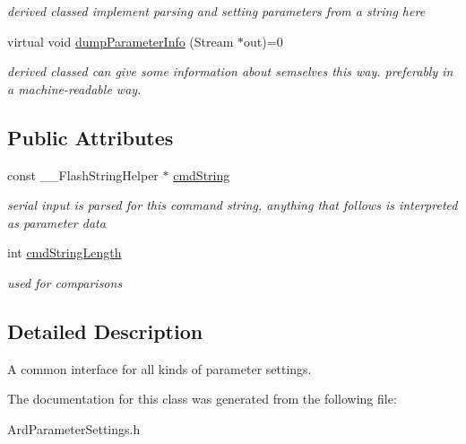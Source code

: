 \begin{DoxyCompactItemize}
\begin{DoxyCompactList}\small\item\em derived classed implement parsing and setting parameters from a string here \end{DoxyCompactList}\item 
\hypertarget{class_abstract_parameter_setting_aefe541268dbae23700182557c13d6b55}{virtual void \hyperlink{class_abstract_parameter_setting_aefe541268dbae23700182557c13d6b55}{dump\-Parameter\-Info} (Stream $\ast$out)=0}\label{class_abstract_parameter_setting_aefe541268dbae23700182557c13d6b55}

\begin{DoxyCompactList}\small\item\em derived classed can give some information about semselves this way. preferably in a machine-\/readable way. \end{DoxyCompactList}\end{DoxyCompactItemize}
\subsection*{Public Attributes}
\begin{DoxyCompactItemize}
\item 
\hypertarget{class_abstract_parameter_setting_a038edb8c34265166b4d7927cf0ee2776}{const \-\_\-\-\_\-\-Flash\-String\-Helper $\ast$ \hyperlink{class_abstract_parameter_setting_a038edb8c34265166b4d7927cf0ee2776}{cmd\-String}}\label{class_abstract_parameter_setting_a038edb8c34265166b4d7927cf0ee2776}

\begin{DoxyCompactList}\small\item\em serial input is parsed for this command string, anything that follows is interpreted as parameter data \end{DoxyCompactList}\item 
\hypertarget{class_abstract_parameter_setting_aa31842d885d857875270a26e389f1abb}{int \hyperlink{class_abstract_parameter_setting_aa31842d885d857875270a26e389f1abb}{cmd\-String\-Length}}\label{class_abstract_parameter_setting_aa31842d885d857875270a26e389f1abb}

\begin{DoxyCompactList}\small\item\em used for comparisons \end{DoxyCompactList}\end{DoxyCompactItemize}


\subsection{Detailed Description}
A common interface for all kinds of parameter settings. 

The documentation for this class was generated from the following file\-:\begin{DoxyCompactItemize}
\item 
Ard\-Parameter\-Settings.\-h\end{DoxyCompactItemize}
